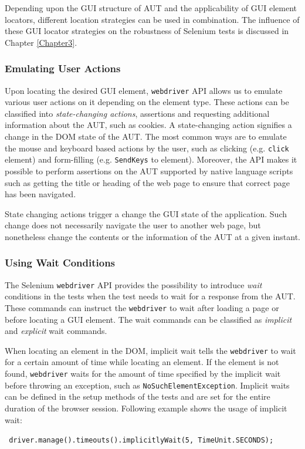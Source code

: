 Depending upon the GUI structure of AUT and the applicability of GUI element locators, different location strategies can be used in combination. The influence of these GUI locator strategies on the robustness of Selenium tests is discussed in Chapter \ref{Chapter3}.
\subsubsection{Emulating User Actions}
\label{sssec:emulatingActions}
Upon locating the desired GUI element, \texttt{webdriver} API allows us to emulate various user actions on it depending on the element type. These actions can be classified into \textit{state-changing actions}, assertions and requesting additional information about the AUT, such as cookies. A state-changing action signifies a change in the DOM state of the AUT. The most common ways are to emulate the mouse and keyboard based actions by the user, such as clicking (e.g. \texttt{click} element) and form-filling (e.g. \texttt{SendKeys} to element). Moreover, the API makes it possible to perform assertions on the AUT supported by native language scripts such as getting the title or heading of the web page to ensure that correct page has been navigated. 

State changing actions trigger a change the GUI state of the application. Such change does not necessarily navigate the user to another web page, but nonetheless change the contents or the information of the AUT at a given instant.

\subsubsection{Using Wait Conditions}
\label{sssec:seleniumwaits}
The Selenium \texttt{webdriver} API provides the possibility to introduce \textit{wait} conditions in the tests when the test needs to wait for a response from the AUT. These commands can instruct the \texttt{webdriver} to wait after loading a page or before locating a GUI element. The wait commands can be classified as \textit{implicit} and \textit{explicit} wait commands. 

When locating an element in the DOM, implicit wait tells the \texttt{webdriver} to wait for a certain amount of time while locating an element. If the element is not found, \texttt{webdriver} waits for the amount of time specified by the implicit wait before throwing an exception, such as \texttt{NoSuchElementException}. Implicit waits can be defined in the setup methods of the tests and are set for the entire duration of the browser session. Following example shows the usage of implicit wait:
\begin{small}
\texttt{ driver.manage().timeouts().implicitlyWait(5, TimeUnit.SECONDS); 
}
\end{small}


